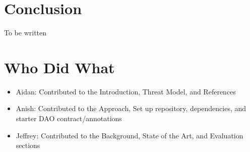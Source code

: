 \documentclass[conference]{IEEEtran}
\begin{document}
\section{Conclusion}
To be written

\section{Who Did What}
\begin{itemize}
    \item Aidan: Contributed to the Introduction, Threat Model, and References
    \item Anish: Contributed to the Approach, Set up repository, dependencies, and starter DAO contract/annotations
    \item Jeffrey: Contributed to the Background, State of the Art, and Evaluation sections
\end{itemize}
\end{document}
